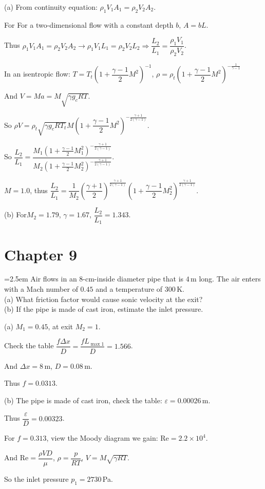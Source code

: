 \documentclass[12pt]{article}
\newlength{\questionlabelwidth}
\newcommand{\question}[2]{%
  \par\noindent
  {\hangindent=2.5em %
   \hangafter=1 %
   \makebox[\questionlabelwidth][l]{\textbf{#1}}#2\par}%
}
\newcommand{\ReN}{\mathrm{Re}}
\begin{document}
\begin{answerbox}
(a) From continuity equation: $\rho_1 V_1 A_1=\rho_2 V_2 A_2$.

For For a two-dimensional flow with a constant depth $b$, $A=bL$.

Thus $\rho_1 V_1 A_1=\rho_2 V_2 A_2 \rightarrow \rho_1 V_1 L_1=\rho_2 V_2 L_2 \Rightarrow \dfrac{L_2}{L_1}=\dfrac{\rho_1 V_1}{\rho_2 V_2}$.

In an isentropic flow: $T=T_t\left(1+\dfrac{\gamma-1}{2}M^2\right)^{-1}$, $\rho = \rho_t \left( 1 + \dfrac{\gamma-1}{2} M^2 \right)^{-\frac{1}{\gamma-1}}$

And $V=Ma=M\sqrt{\gamma g_c R T}$.

So $\rho V=\rho_t \sqrt{\gamma g_c R T_t}M\left(1+\dfrac{\gamma-1}{2}M^2\right)^{-\frac{\gamma+1}{2(\gamma-1)}}$.

So $\dfrac{L_2}{L_1}=\dfrac{M_1\left(1+\frac{\gamma-1}{2}M_1^2\right)^{-\frac{\gamma+1}{2(\gamma-1)}}}{M_2\left(1+\frac{\gamma-1}{2}M_2^2\right)^{-\frac{\gamma+1}{2(\gamma-1)}}}$.

$M=1.0$, thus $\dfrac{L_2}{L_1}=\dfrac{1}{M_2}\left(\dfrac{\gamma+1}{2}\right)^{\frac{\gamma+1}{2(\gamma-1)}}\left(1+\dfrac{\gamma-1}{2}M_2^2\right)^{\frac{\gamma+1}{2(\gamma-1)}}$.

(b) For$M_2=1.79$, $\gamma=1.67$, $\dfrac{L_2}{L_1}=1.343$.
\end{answerbox}

\newpage

\section{Chapter 9}

\question{9.5}{Air flows in an $8$-\si{cm}-inside diameter pipe that is $4$\,\si{m} long. The air enters with a Mach number of $0.45$ and a temperature of $300$\,\si{K}.\\
(a) What friction factor would cause sonic velocity at the exit?\\
(b) If the pipe is made of cast iron, estimate the inlet pressure.
}

\begin{answerbox}
(a) $M_1=0.45$, at exit $M_2=1$.

Check the table $\dfrac{f\Delta x}{D}=\dfrac{fL_{\max 1}}{D}=1.566$.

And $\Delta x=8$\,\si{m}, $D=0.08$\,\si{m}.

Thus $f=0.0313$.

(b) The pipe is made of cast iron, check the table: $\varepsilon=0.00026$\,\si{m}.

Thus $\dfrac{\varepsilon}{D}=0.00323$.

For $f=0.313$, view the Moody diagram we gain: $\ReN=2.2\times 10^4$.

And $\ReN=\dfrac{\rho V D}{\mu}$, $\rho=\dfrac{p}{R T}$, $V=M\sqrt{\gamma R T}$.

So the inlet pressure $p_1=2730$\,\si{Pa}.
\end{answerbox}
\end{document}
